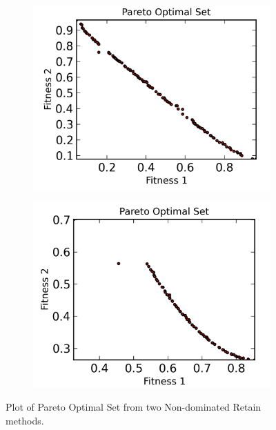 \documentclass[11pt, runningheads,a4paper]{llncs}
\begin{document}
\begin{figure}
        \centering
        \begin{subfigure}[b]{0.4\textwidth}
                \centering
                \includegraphics[width=\textwidth]{./figs/nearst2.png}
        \end{subfigure}
        \begin{subfigure}[b]{0.4\textwidth}
                \centering
                \includegraphics[width=\textwidth]{./figs/niche.png}
        \end{subfigure}
        \caption{Plot of Pareto Optimal Set from two Non-dominated Retain methods.}\label{fig:density}
\end{figure}
\end{document}
